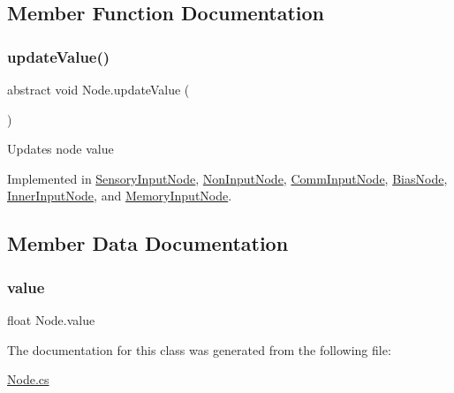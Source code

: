 \subsection{Member Function Documentation}
\mbox{\label{class_node_a85ebd0e36c25430570b94f923afd2a62}} 
\subsubsection{\texorpdfstring{update\+Value()}{updateValue()}}
{\footnotesize\ttfamily abstract void Node.\+update\+Value (\begin{DoxyParamCaption}{ }\end{DoxyParamCaption})\hspace{0.3cm}{\ttfamily [pure virtual]}}



Updates node value 



Implemented in \mbox{\hyperlink{class_sensory_input_node_a3db8f13a203e1e604a3b79a20153cfa7}{Sensory\+Input\+Node}}, \mbox{\hyperlink{class_non_input_node_a075d0278c5500f0d2455a3d8eeb04f55}{Non\+Input\+Node}}, \mbox{\hyperlink{class_comm_input_node_a22f5ea13329e77f47db18d28336cc52e}{Comm\+Input\+Node}}, \mbox{\hyperlink{class_bias_node_a84e7e92b97256707aba057ec92bd7a79}{Bias\+Node}}, \mbox{\hyperlink{class_inner_input_node_ac67f9a1dcd0ae72d2d7fe4cfa7f91152}{Inner\+Input\+Node}}, and \mbox{\hyperlink{class_memory_input_node_aa1efec4e8bc221a879c959ba9941587b}{Memory\+Input\+Node}}.



\subsection{Member Data Documentation}
\mbox{\label{class_node_a4d82b89fd1d72cc0184763279a3811dc}} 
\subsubsection{\texorpdfstring{value}{value}}
{\footnotesize\ttfamily float Node.\+value}



The documentation for this class was generated from the following file\+:\begin{DoxyCompactItemize}
\item 
\mbox{\hyperlink{_node_8cs}{Node.\+cs}}\end{DoxyCompactItemize}
